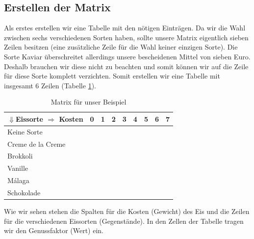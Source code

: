\documentclass[a4paper, 12pt]{article}
\begin{document}
\subsection{Erstellen der Matrix}

Als erstes erstellen wir eine Tabelle mit den nötigen Einträgen. Da wir die Wahl zwischen sechs verschiedenen Sorten haben, sollte unsere Matrix eigentlich sieben Zeilen besitzen (eine zusätzliche Zeile für die Wahl keiner einzigen Sorte). Die Sorte Kaviar überschreitet allerdings unsere bescheidenen Mittel von sieben Euro. Deshalb brauchen wir diese nicht zu beachten und somit können wir auf die Zeile für diese Sorte komplett verzichten. Somit erstellen wir eine Tabelle mit insgesamt 6 Zeilen (Tabelle \ref{table:Leer}).

\begin{table}[H]
	\begin{center}
		\begin{tabular}{l|cccccccc}
			$\Downarrow$Eissorte $\Rightarrow$ Kosten & 0 & 1 & 2 & 3 & 4 & 5 & 
			6 & 7\\
			\hline
			Keine Sorte			&	&	&	&	&	&	&	&\\
			Creme de la Creme	&	&	&	&	&	&	&	&\\
			Brokkoli			&	&	&	&	&	&	&	&\\
			Vanille				&	&	&	&	&	&	&	&\\
			Málaga				&	&	&	&	&	&	&	&\\
			Schokolade			&	&	&	&	&	&	&	&\\
		\end{tabular}
	\end{center}
\caption{Matrix für unser Beispiel}
\label{table:Leer}
\end{table}

Wie wir sehen stehen die Spalten für die Kosten (Gewicht) des Eis und die Zeilen für die verschiedenen Eissorten (Gegenstände). In den Zellen der Tabelle tragen wir den Genussfaktor (Wert) ein.
\end{document}
